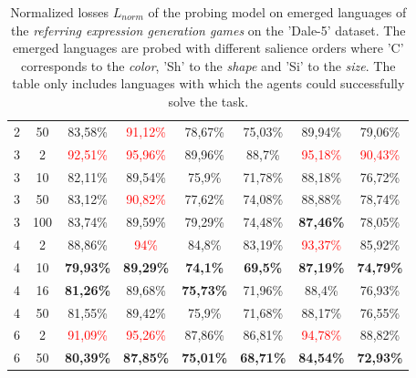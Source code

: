 \begin{table}[ht]
\begin{tabular}{cc|c|c|c|c|c|c}
        {2} & {50}  & {83,58\%}                & \textcolor{red}{91,12\%} & {78,67\%}                & {75,03\%}            & {89,94\%}                & {79,06\%}                \\
        {3} & {2}   & \textcolor{red}{92,51\%} & \textcolor{red}{95,96\%} & {89,96\%}                & {88,7\%}             & \textcolor{red}{95,18\%} & \textcolor{red}{90,43\%} \\
        {3} & {10}  & {82,11\%}                & {89,54\%}                & {75,9\%}                 & {71,78\%}            & {88,18\%}                & {76,72\%}                \\
        {3} & {50}  & {83,12\%}                & \textcolor{red}{90,82\%} & {77,62\%}                & {74,08\%}            & {88,88\%}                & {78,74\%}                \\
        {3} & {100} & {83,74\%}                & {89,59\%}                & {79,29\%}                & {74,48\%}            & \textbf{87,46\%}         & {78,05\%}                \\
        {4} & {2}   & {88,86\%}                & \textcolor{red}{94\%}    & {84,8\%}                 & {83,19\%}            & \textcolor{red}{93,37\%} & {85,92\%}                \\
        {4} & {10}  & \textbf{79,93\%}         & \textbf{89,29\%}         & \textbf{74,1\%}          & \textbf{69,5\%}      & \textbf{87,19\%}         & \textbf{74,79\%}         \\
        {4} & {16}  & \textbf{81,26\%}         & {89,68\%}                & \textbf{75,73\%}         & {71,96\%}            & {88,4\%}                 & {76,93\%}                \\
        {4} & {50}  & {81,55\%}                & {89,42\%}                & {75,9\%}                 & {71,68\%}            & {88,17\%}                & {76,55\%}                \\
        {6} & {2}   & \textcolor{red}{91,09\%} & \textcolor{red}{95,26\%} & {87,86\%}                & {86,81\%}            & \textcolor{red}{94,78\%} & {88,82\%}                \\
        {6} & {50}  & \textbf{80,39\%}         & \textbf{87,85\%}         & \textbf{75,01\%}         & \textbf{68,71\%}     & \textbf{84,54\%}         & \textbf{72,93\%}         \\
        \bottomrule
    \end{tabular}
    \caption{Normalized losses $L_{norm}$ of the probing model on emerged languages of the \emph{referring expression generation games} on the 'Dale-5' dataset. The emerged languages are probed with different salience orders where 'C' corresponds to the \emph{color}, 'Sh' to the \emph{shape} and 'Si' to the \emph{size}. The table only includes languages with which the agents could successfully solve the task.}
    \label{tab:probing:re-generator:dale-5}
\end{table}

